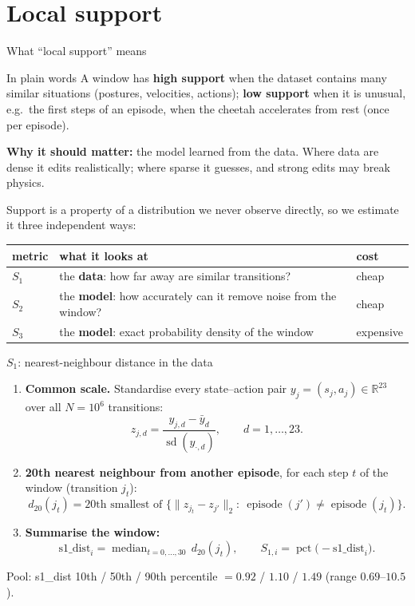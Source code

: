 \documentclass[aspectratio=169,11pt]{beamer}
\DeclareMathOperator{\pct}{pct}
\DeclareMathOperator{\median}{median}
\DeclareMathOperator{\sd}{sd}
\newcommand{\R}{\mathbb{R}}
\begin{document}
\section{Local support}
\begin{frame}{What ``local support'' means}
\begin{block}{In plain words}
A window has \textbf{high support} when the dataset contains many similar situations (postures, velocities, actions); \textbf{low support} when it is unusual, e.g.\ the first steps of an episode, when the cheetah accelerates from rest (once per episode).
\end{block}
\textbf{Why it should matter:} the model learned from the data. Where data are dense it edits realistically; where sparse it guesses, and strong edits may break physics.
\vspace{0.5em}

Support is a property of a distribution we never observe directly, so we estimate it three independent ways:
\vspace{0.3em}

\begin{tabularx}{\linewidth}{lYl}
\toprule
metric & what it looks at & cost\\
\midrule
$S_1$ & the \textbf{data}: how far away are similar transitions? & cheap\\
$S_2$ & the \textbf{model}: how accurately can it remove noise from the window? & cheap\\
$S_3$ & the \textbf{model}: exact probability density of the window & expensive\\
\bottomrule
\end{tabularx}
\end{frame}

\begin{frame}{$S_1$: nearest-neighbour distance in the data}
\begin{enumerate}
\item \textbf{Common scale.} Standardise every state--action pair $y_j=(s_j,a_j)\in\R^{23}$ over all $N=10^6$ transitions:
\[
z_{j,d}=\frac{y_{j,d}-\bar y_d}{\sd(y_{\cdot,d})},\qquad d=1,\dots,23.
\]
\item \textbf{20th nearest neighbour from another episode}, for each step $t$ of the window (transition $j_t$):
\[
d_{20}(j_t)=\text{20th smallest of }\bigl\{\lVert z_{j_t}-z_{j'}\rVert_2:\ \operatorname{episode}(j')\neq\operatorname{episode}(j_t)\bigr\}.
\]
\item \textbf{Summarise the window:}
\[
\mathrm{s1\_dist}_i=\median_{t=0,\dots,30}\,d_{20}(j_t),\qquad S_{1,i}=\pct\bigl(-\mathrm{s1\_dist}_i\bigr).
\]
\end{enumerate}
Pool: s1\_dist 10th / 50th / 90th percentile $=0.92$ / $1.10$ / $1.49$ (range $0.69$--$10.5$).
\end{frame}
\end{document}
